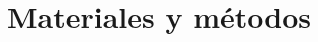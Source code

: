 \documentclass[main.tex]{subfiles}
\begin{document}
	\onlyinsubfile{
		\tableofcontents
		\listoftodos[Notes]
	}

\chapter{Materiales y métodos}

\lipsum[1-8]

\onlyinsubfile{
	
	
}
\end{document}
